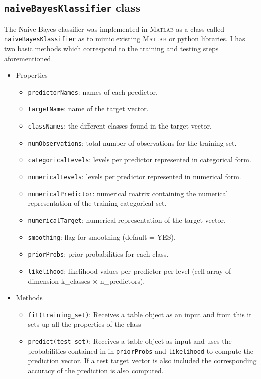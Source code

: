 \subsection{\texttt{naiveBayesKlassifier} class}

The Naive Bayes classifier was implemented in \textsc{Matlab} as a class called \texttt{naiveBayesKlassifier} as to mimic existing \textsc{Matlab} or python libraries. I has two basic methods which correspond to the training and testing steps aforementioned.

\begin{itemize}
	\item Properties	
	\begin{itemize}
		\item \texttt{predictorNames}: names of each predictor.
		\item \texttt{targetName}: name of the target vector.
		\item \texttt{classNames}: the different classes found in the target vector.
		\item \texttt{numObservations}: total number of observations for the training set.
		\item \texttt{categoricalLevels}: levels per predictor represented in categorical form.
		\item \texttt{numericalLevels}: levels per predictor represented in numerical form.
		\item \texttt{numericalPredictor}: numerical matrix containing the numerical representation of the training categorical set.
		\item \texttt{numericalTarget}: numerical representation of the target vector.
		\item \texttt{smoothing}: flag for smoothing (default = YES).
		\item \texttt{priorProbs}: prior probabilities for each class.
		\item \texttt{likelihood}: likelihood values per predictor per level (cell array of dimension k\_classes $\times$ n\_predictors).
	\end{itemize}
	\item Methods
	\begin{itemize}
		\item \texttt{fit(training\_set)}:
		Receives a table object as an input and from this it sets up all the properties of the class
		\item \texttt{predict(test\_set)}:
		Receives a table object as input and uses the probabilities contained  in in \texttt{priorProbs} and \texttt{likelihood} to compute the prediction vector. If a test target vector is also included the corresponding accuracy of the prediction is also computed.
	\end{itemize}
\end{itemize}


